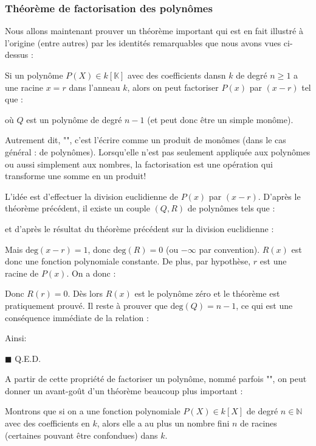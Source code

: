 	
	\pagebreak
	\subsubsection{Théorème de factorisation des polynômes}\label{factorization theorem}
	Nous allons maintenant prouver un théorème important qui est en fait illustré à l'origine (entre autres) par les identités remarquables que nous avons vues ci-dessus :
	
	\begin{theorem}
	Si un polynôme $P(X)\in k[\mathbb{K}]$ avec des coefficients dansn $k$ de degré $n\geq 1$ a une racine $x=r$ dans l'anneau $k$, alors on peut factoriser $P(x)$ par $(x - r)$ tel que :
	
	où $Q$ est un polynôme de degré $n-1$ (et peut donc être un simple monôme).
	
	Autrement dit, "", c'est l'écrire comme un produit de monômes (dans le cas général : de polynômes). Lorsqu'elle n'est pas seulement appliquée aux polynômes ou aussi simplement aux nombres, la factorisation est une opération qui transforme une somme en un produit!
	\end{theorem}
	\begin{dem}
	L'idée est d'effectuer la division euclidienne de $P(x)$ par $(x-r)$. D'après le théorème précédent, il existe un couple $(Q, R)$ de polynômes tels que :
	
	et d'après le résultat du théorème précédent sur la division euclidienne :
	
	Mais $\text{deg}(x-r)=1$, donc $\text{deg}(R)=0$ (ou $-\infty$ par convention). $R(x)$ est donc une fonction polynomiale constante. De plus, par hypothèse, $r$ est une racine de $P(x)$. On a donc :
	
	Donc $R(r)=0$. Dès lors $R(x)$ est le polynôme zéro et le théorème est pratiquement prouvé. Il reste à prouver que $\text{deg}(Q)=n-1$, ce qui est une conséquence immédiate de la relation :
	
	Ainsi:
	
	\begin{flushright}
		$\blacksquare$  Q.E.D.
	\end{flushright}
	\end{dem}
	A partir de cette propriété de factoriser un polynôme, nommé parfois "", on peut donner un avant-goût d'un théorème beaucoup plus important :
	\begin{theorem}
	Montrons que si on a une fonction polynomiale $P(X)\in k[X]$ de degré $n\in \mathbb{N}$ avec des coefficients en $k$, alors elle a au plus un nombre fini $ n$ de racines (certaines pouvant être confondues) dans $k$.
	\end{theorem}

